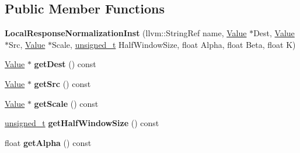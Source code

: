 \subsection*{Public Member Functions}
\begin{DoxyCompactItemize}
\item 
\mbox{\label{classglow_1_1_local_response_normalization_inst_a39de593b38734175fd7bbab21690488c}} 
{\bfseries Local\+Response\+Normalization\+Inst} (llvm\+::\+String\+Ref name, \hyperlink{classglow_1_1_value}{Value} $\ast$Dest, \hyperlink{classglow_1_1_value}{Value} $\ast$Src, \hyperlink{classglow_1_1_value}{Value} $\ast$Scale, \hyperlink{namespaceglow_a0ca574644e1e42ef193a9947fb4d8911}{unsigned\+\_\+t} Half\+Window\+Size, float Alpha, float Beta, float K)
\item 
\mbox{\label{classglow_1_1_local_response_normalization_inst_a0b5c95463122424078445d6f2af85deb}} 
\hyperlink{classglow_1_1_value}{Value} $\ast$ {\bfseries get\+Dest} () const
\item 
\mbox{\label{classglow_1_1_local_response_normalization_inst_afdaacde4aebc9454ba3ea3c4cf2dd157}} 
\hyperlink{classglow_1_1_value}{Value} $\ast$ {\bfseries get\+Src} () const
\item 
\mbox{\label{classglow_1_1_local_response_normalization_inst_abcb5f5cd4f68f9d07019273194d662bd}} 
\hyperlink{classglow_1_1_value}{Value} $\ast$ {\bfseries get\+Scale} () const
\item 
\mbox{\label{classglow_1_1_local_response_normalization_inst_a2765b36e739412453a8b14bbe5d3376e}} 
\hyperlink{namespaceglow_a0ca574644e1e42ef193a9947fb4d8911}{unsigned\+\_\+t} {\bfseries get\+Half\+Window\+Size} () const
\item 
\mbox{\label{classglow_1_1_local_response_normalization_inst_a90c881a7ec40eef4a77df55d10f1935f}} 
float {\bfseries get\+Alpha} () const
\item 
\mbox{\label{classglow_1_1_local_response_normalization_inst_ac7e7ac7b6ae12e9c2a2ed6391896734e}} 

\end{DoxyCompactItemize}
